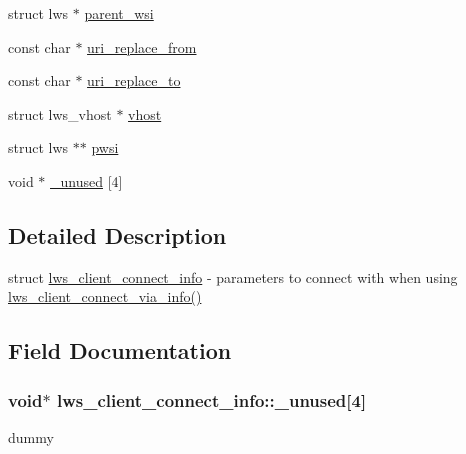 \begin{DoxyCompactItemize}
\item 
struct lws $\ast$ \hyperlink{structlws__client__connect__info_a6843a60e1050b10db9d98d7eeb45f587}{parent\+\_\+wsi}
\item 
const char $\ast$ \hyperlink{structlws__client__connect__info_a03c305fdca809667b6a9a83b3edfd83a}{uri\+\_\+replace\+\_\+from}
\item 
const char $\ast$ \hyperlink{structlws__client__connect__info_a9959ba103d3d2484e559a9f7879eebe3}{uri\+\_\+replace\+\_\+to}
\item 
struct lws\+\_\+vhost $\ast$ \hyperlink{structlws__client__connect__info_a3893181d728f326f9f5b47c1459cb8be}{vhost}
\item 
struct lws $\ast$$\ast$ \hyperlink{structlws__client__connect__info_a065063b5117ecd0a59567c97f04bda2e}{pwsi}
\item 
void $\ast$ \hyperlink{structlws__client__connect__info_ad47f50d1633dc5df74548606c9a66d73}{\+\_\+unused} \mbox{[}4\mbox{]}
\end{DoxyCompactItemize}


\subsection{Detailed Description}
struct \hyperlink{structlws__client__connect__info}{lws\+\_\+client\+\_\+connect\+\_\+info} -\/ parameters to connect with when using \hyperlink{group__client_ga0c966136905f467816307cfba6deb5fd}{lws\+\_\+client\+\_\+connect\+\_\+via\+\_\+info()} 

\subsection{Field Documentation}
\subsubsection[{\texorpdfstring{\+\_\+unused}{\_unused}}]{\setlength{\rightskip}{0pt plus 5cm}void$\ast$ lws\+\_\+client\+\_\+connect\+\_\+info\+::\+\_\+unused\mbox{[}4\mbox{]}}\hypertarget{structlws__client__connect__info_ad47f50d1633dc5df74548606c9a66d73}{}\label{structlws__client__connect__info_ad47f50d1633dc5df74548606c9a66d73}
dummy 
